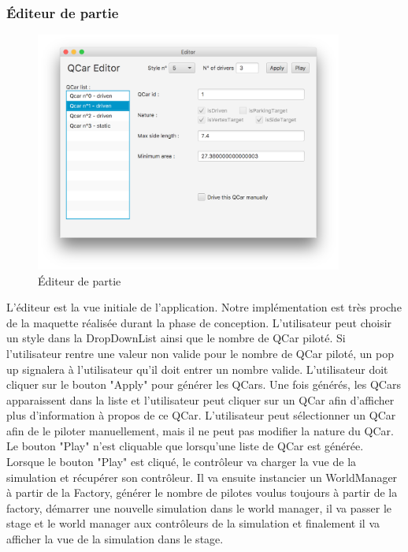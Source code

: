 \documentclass[a4paper, 12pt]{article}
\begin{document}
\subsubsection{Éditeur de partie}
\begin{figure}[H]
 \centering
 \includegraphics[width=0.9\textwidth]{includes/images/editor}
 \caption{\label{fig:editeur}Éditeur de partie}
\end{figure}
L'éditeur est la vue initiale de l'application. Notre implémentation est très proche de la maquette réalisée durant la phase de conception. L'utilisateur peut choisir un style dans la DropDownList ainsi que le nombre de QCar piloté. Si l'utilisateur rentre une valeur non valide pour le nombre de QCar piloté, un pop up signalera à l'utilisateur qu'il doit entrer un nombre valide. L'utilisateur doit cliquer sur le bouton "Apply" pour générer les QCars. Une fois générés, les QCars apparaissent dans la liste et l'utilisateur peut cliquer sur un QCar afin d'afficher plus d'information à propos de ce QCar. L'utilisateur peut sélectionner un QCar afin de le piloter manuellement, mais il ne peut pas modifier la nature du QCar. Le bouton "Play" n'est cliquable que lorsqu'une liste de QCar est générée. Lorsque le bouton "Play" est cliqué, le contrôleur va charger la vue de la simulation et récupérer son contrôleur. Il va ensuite instancier un WorldManager à partir de la Factory, générer le nombre de pilotes voulus toujours à partir de la factory, démarrer une nouvelle simulation dans le world manager, il va passer le stage et le world manager aux contrôleurs de la simulation et finalement il va afficher la vue de la simulation dans le stage.
\end{document}
